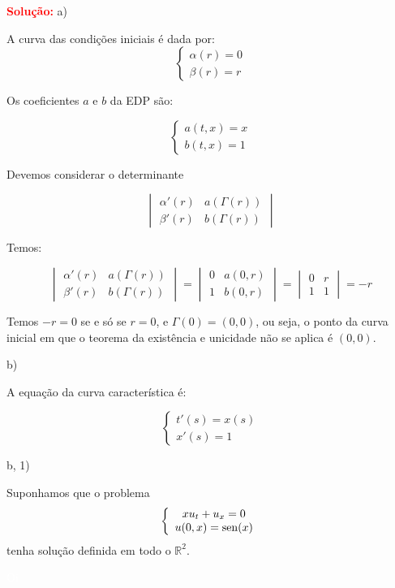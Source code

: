 \documentclass[11pt,a4paper]{article}
\newcommand{\solucao}[1]{\begin{mdframed}[style=MyFrame]
\textbf{\textcolor{red}{Solução:}} #1
\end{mdframed}\textcolor{white}{Oi} \newline}
\begin{document}
\medskip
\noindent
\solucao{
a)

\medskip
\noindent
A curva das condições iniciais é dada por:
\[
\begin{cases}
    \alpha(r)=0 \\
    \beta(r)=r
\end{cases}
\]

\medskip
\noindent
Os coeficientes $a$ e $b$ da EDP são:

\[
\begin{cases}
    a(t,x)=x\\
    b(t,x)=1
\end{cases}
\]

\noindent
Devemos considerar o determinante

\[
\begin{vmatrix}\alpha'(r)&a(\Gamma(r))\\\beta'(r)&b(\Gamma(r))\end{vmatrix}
\]

\noindent
Temos:

\[
\begin{vmatrix}\alpha'(r)&a(\Gamma(r))\\\beta'(r)&b(\Gamma(r))\end{vmatrix}=\begin{vmatrix}0&a(0,r)\\1&b(0,r)\end{vmatrix}=\begin{vmatrix}0&r\\1&1\end{vmatrix}=-r
\]

\noindent
Temos $-r=0$ se e só se $r=0$, e $\Gamma(0)=(0,0)$, ou seja, o ponto da curva inicial em que o teorema da existência e unicidade não se aplica é $(0,0)$.

\bigskip
\noindent
b)

\medskip
\noindent
A equação da curva característica é:

\[
\begin{cases}
    t'(s)=x(s) \\
    x'(s)=1
\end{cases}
\]

\bigskip
\noindent
b, 1)

Suponhamos que o problema
\[
\left\{\begin{array}{c}
xu_t + u_x = 0 \\
u(0,x) = {\rm sen}(x)
\end{array}
\right.
\]
tenha solução definida em todo o $\mathbb{R}^2$.

}
\end{document}
